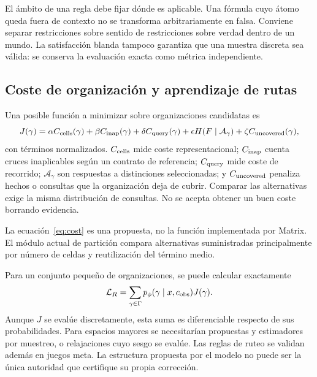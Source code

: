 \documentclass[11pt,a4paper]{article}
\newcommand{\loss}{\mathcal{L}}
\begin{document}
El ámbito de una regla debe fijar dónde es aplicable. Una fórmula cuyo átomo
queda fuera de contexto no se transforma arbitrariamente en falsa. Conviene
separar restricciones sobre sentido de restricciones sobre verdad dentro de un
mundo. La satisfacción blanda tampoco garantiza que una muestra discreta sea
válida: se conserva la evaluación exacta como métrica independiente.

\subsection{Coste de organización y aprendizaje de rutas}
Una posible función a minimizar sobre organizaciones candidatas es
\begin{equation}\label{eq:cost}
 J(\gamma)=\alpha C_{\rm cells}(\gamma)
 +\beta C_{\rm inap}(\gamma)
 +\delta C_{\rm query}(\gamma)
 +\epsilon H(F\mid\mathcal{A}_\gamma)
 +\zeta C_{\rm uncovered}(\gamma),
\end{equation}
con términos normalizados. $C_{\rm cells}$ mide coste representacional;
$C_{\rm inap}$ cuenta cruces inaplicables según un contrato de referencia;
$C_{\rm query}$ mide coste de recorrido; $\mathcal{A}_\gamma$ son respuestas a
distinciones seleccionadas; y $C_{\rm uncovered}$ penaliza hechos o consultas
que la organización deja de cubrir. Comparar las alternativas exige la misma
distribución de consultas. No se acepta obtener un buen coste borrando evidencia.

La ecuación~\ref{eq:cost} es una propuesta, no la función implementada por Matrix.
El módulo actual de partición compara alternativas suministradas principalmente
por número de celdas y reutilización del término medio.

Para un conjunto pequeño de organizaciones, se puede calcular exactamente
\begin{equation}
 \loss_R=\sum_{\gamma\in\Gamma}
 p_\phi(\gamma\mid x,c_{\rm obs})J(\gamma).
\end{equation}
Aunque $J$ se evalúe discretamente, esta suma es diferenciable respecto de sus
probabilidades. Para espacios mayores se necesitarían propuestas y estimadores
por muestreo, o relajaciones cuyo sesgo se evalúe. Las reglas de ruteo se validan
además en juegos meta. La estructura propuesta por el modelo no puede ser la
única autoridad que certifique su propia corrección.
\end{document}
